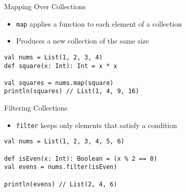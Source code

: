 %
%

\begin{frame}[fragile]{Mapping Over Collections}
\begin{itemize}
    \item \texttt{map} applies a function to each element of a collection
    \item Produces a new collection of the same size
\end{itemize}

\begin{verbatim}
val nums = List(1, 2, 3, 4)
def square(x: Int): Int = x * x

val squares = nums.map(square)
println(squares) // List(1, 4, 9, 16)
\end{verbatim}

\end{frame}

\begin{frame}[fragile]{Filtering Collections}
\begin{itemize}
    \item \texttt{filter} keeps only elements that satisfy a condition
\end{itemize}

\begin{verbatim}
val nums = List(1, 2, 3, 4, 5, 6)

def isEven(x: Int): Boolean = (x % 2 == 0)
val evens = nums.filter(isEven)

println(evens) // List(2, 4, 6)
\end{verbatim}

\end{frame}

